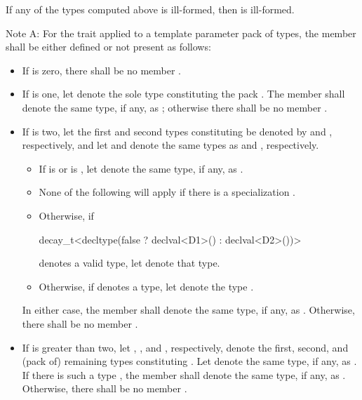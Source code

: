If any of the types computed above is ill-formed, then
 is ill-formed.

\pnum
Note A:
For the  trait applied to a template parameter pack  of types,
the member  shall be either defined or not present as follows:

\begin{itemize}
\item If  is zero, there shall be no member .

\item If  is one, let  denote the sole type
constituting the pack .
The member   shall denote the same
type, if any, as ;
otherwise there shall be no member .

\item If  is two,
let the first and second types constituting  be denoted
by  and , respectively, and
let  and  denote
the same types as  and , respectively.
  \begin{itemize}
  \item If  is  or
      is ,
     let  denote the same type, if any,
     as .
  \item
    \begin{note}
      None of the following will apply if there is a specialization
      .
    \end{note}
  \item Otherwise, if
\begin{codeblock}
decay_t<decltype(false ? declval<D1>() : declval<D2>())>
\end{codeblock}
    denotes a valid type, let  denote that type.
  \item Otherwise, if
    denotes a type, let  denote the type
    .
  \end{itemize}
In either case, the member   shall denote
the same type, if any, as .
Otherwise, there shall be no member .

\item If  is greater than two,
let , , and , respectively,
denote the first, second, and (pack of) remaining types constituting .
Let  denote the same type, if any, as .
If there is such a type , the member  
shall denote the same type, if any, as .
Otherwise, there shall be no member .
\end{itemize}

